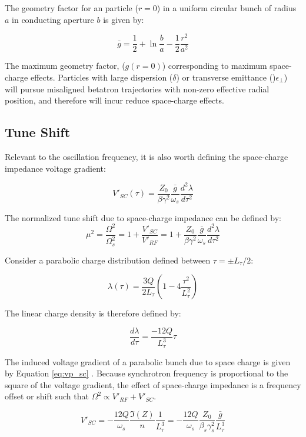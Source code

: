 The geometry factor for an particle ($r=0$) in a uniform circular bunch of radius $a$ in conducting aperture $b$ is given by:

$$\bar{g} = \frac{1}{2} + \ln\frac{b}{a} - \frac{1}2{}\frac{r^2}{a^2}$$

The maximum geometry factor, ($g(r=0)$) corresponding to maximum space-charge effects. Particles with large dispersion ($\delta$) or transverse emittance ()$\epsilon_\perp$) will pursue misaligned betatron trajectories with non-zero effective radial position, and therefore will incur reduce space-charge effects.

\subsection{Tune Shift}

Relevant to the oscillation frequency, it is also worth defining the space-charge impedance voltage gradient:

\begin{equation}
    V'_{SC}(\tau) = \frac{Z_0}{\beta\gamma^2}\frac{\bar{g}}{\omega_s}\frac{d^2\lambda}{d\tau^2}
\end{equation}

The normalized tune shift due to space-charge impedance can be defined by:
\begin{equation}
    \mu^2 = \frac{\Omega^2}{\Omega_s^2} = 1 + \frac{V'_{SC}}{V'_{RF}} = 1 + \frac{Z_0}{\beta\gamma^2}\frac{\bar{g}}{\omega_s}\frac{d^2\lambda}{d\tau^2}
    \label{eq:tune_shift}
\end{equation}

Consider a parabolic charge distribution defined between $\tau = \pm L_\tau/2$:

$$\lambda(\tau)=\frac{3Q}{2L_\tau}\left(1-4\frac{\tau^2}{L_\tau^2}\right)$$

The linear charge density is therefore defined by:

$$\frac{d\lambda}{d\tau} = \frac{-12Q}{L_\tau^3}\tau$$

The induced voltage gradient of a parabolic bunch due to space charge is given by Equation \ref{eq:vp_sc} \cite{lasheen_longitudinal_2016}. Because synchrotron frequency is proportional to the square of the voltage gradient, the effect of space-charge impedance is a frequency offset or shift such that $\Omega^2 \propto V'_{RF} + V'_{SC}$.

\begin{equation}
    V'_{SC} = -\frac{12Q}{\omega_s}\frac{\Im (Z)}{n}\frac{1}{L_\tau^3}=-\frac{12Q}{\omega_s}\frac{Z_0}{\beta_s\gamma_s^2}\frac{\bar{g}}{L_\tau^3}
    \label{eq:vp_sc}
\end{equation}

